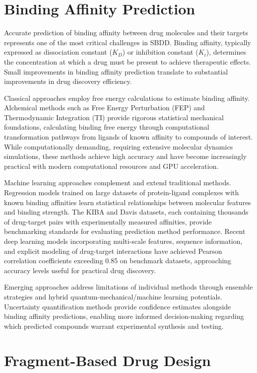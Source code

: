 \documentclass[12pt,a4paper]{article}
\begin{document}
\section*{Binding Affinity Prediction}

Accurate prediction of binding affinity between drug molecules and their targets represents one of the most critical challenges in SBDD. Binding affinity, typically expressed as dissociation constant ($K_D$) or inhibition constant ($K_i$), determines the concentration at which a drug must be present to achieve therapeutic effects. Small improvements in binding affinity prediction translate to substantial improvements in drug discovery efficiency.

Classical approaches employ free energy calculations to estimate binding affinity. Alchemical methods such as Free Energy Perturbation (FEP) and Thermodynamic Integration (TI) provide rigorous statistical mechanical foundations, calculating binding free energy through computational transformation pathways from ligands of known affinity to compounds of interest. While computationally demanding, requiring extensive molecular dynamics simulations, these methods achieve high accuracy and have become increasingly practical with modern computational resources and GPU acceleration.

Machine learning approaches complement and extend traditional methods. Regression models trained on large datasets of protein-ligand complexes with known binding affinities learn statistical relationships between molecular features and binding strength. The KIBA and Davis datasets, each containing thousands of drug-target pairs with experimentally measured affinities, provide benchmarking standards for evaluating prediction method performance. Recent deep learning models incorporating multi-scale features, sequence information, and explicit modeling of drug-target interactions have achieved Pearson correlation coefficients exceeding 0.85 on benchmark datasets, approaching accuracy levels useful for practical drug discovery.

Emerging approaches address limitations of individual methods through ensemble strategies and hybrid quantum-mechanical/machine learning potentials. Uncertainty quantification methods provide confidence estimates alongside binding affinity predictions, enabling more informed decision-making regarding which predicted compounds warrant experimental synthesis and testing.

\section*{Fragment-Based Drug Design}
\end{document}

